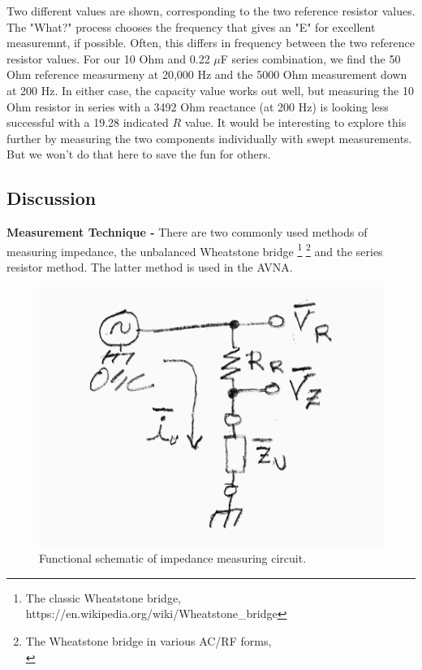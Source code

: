 %
Two different values are shown, corresponding to the two reference resistor values.  The "What?" process chooses the frequency that gives an "E" for excellent measuremnt, if possible.  Often, this differs in frequency between the two reference resistor values.  For our 10 Ohm and 0.22 $\mu$F series combination, we find the 50 Ohm reference measurmeny at 20,000 Hz and the 5000 Ohm measurement down at 200 Hz.  In either case, the capacity value works out well, but measuring the 10 Ohm resistor in series with a 3492 Ohm reactance (at 200 Hz) is looking less successful with a 19.28 indicated \(R\) value.  It would be interesting to explore this further by measuring the two components individually with swept measurements.  But we won't do that here to save the fun for others.
%
\subsection{Discussion}
%
\textbf{Measurement Technique - } There are two commonly used methods of measuring impedance, the unbalanced Wheatstone bridge
%
\footnote{The classic Wheatstone bridge, https://en.wikipedia.org/wiki/Wheatstone\_bridge}
\footnote{The Wheatstone bridge in various AC/RF forms,\\ \hspace*{1.0 in}{http://g3ynh.info/zdocs/bridges/part\_1.html}}
%
 and the series resistor method.   The latter method is used in the AVNA.
\begin{figure}[H]
\begin{center}
\includegraphics[scale=0.75]{./images/AVNA_900.pdf}
\caption{Functional schematic of impedance measuring circuit.}
\label{AVNA_900-label}
\end{center}
\end{figure}
